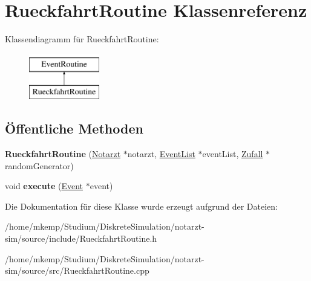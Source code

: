 \hypertarget{classRueckfahrtRoutine}{}\section{Rueckfahrt\+Routine Klassenreferenz}
\label{classRueckfahrtRoutine}
Klassendiagramm für Rueckfahrt\+Routine\+:\begin{figure}[H]
\begin{center}
\leavevmode
\includegraphics[height=2.000000cm]{classRueckfahrtRoutine}
\end{center}
\end{figure}
\subsection*{Öffentliche Methoden}
\begin{DoxyCompactItemize}
\item 
{\bfseries Rueckfahrt\+Routine} (\hyperlink{classNotarzt}{Notarzt} $\ast$notarzt, \hyperlink{classEventList}{Event\+List} $\ast$event\+List, \hyperlink{classZufall}{Zufall} $\ast$random\+Generator)\hypertarget{classRueckfahrtRoutine_af906605c22d0d8fd2d002f4fa165afee}{}\label{classRueckfahrtRoutine_af906605c22d0d8fd2d002f4fa165afee}

\item 
void {\bfseries execute} (\hyperlink{classEvent}{Event} $\ast$event)\hypertarget{classRueckfahrtRoutine_a7eec059994f3c958696697df05cfefe9}{}\label{classRueckfahrtRoutine_a7eec059994f3c958696697df05cfefe9}

\end{DoxyCompactItemize}


Die Dokumentation für diese Klasse wurde erzeugt aufgrund der Dateien\+:\begin{DoxyCompactItemize}
\item 
/home/mkemp/\+Studium/\+Diskrete\+Simulation/notarzt-\/sim/source/include/Rueckfahrt\+Routine.\+h\item 
/home/mkemp/\+Studium/\+Diskrete\+Simulation/notarzt-\/sim/source/src/Rueckfahrt\+Routine.\+cpp\end{DoxyCompactItemize}
